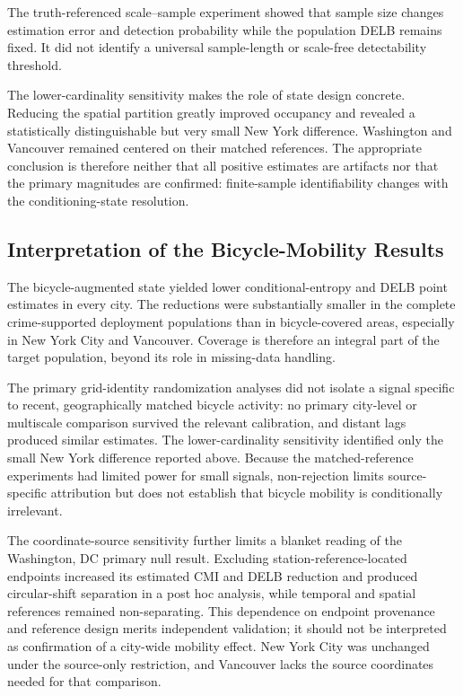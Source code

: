 \documentclass[applsci,article,accept,moreauthors]{Definitions/mdpi}
\begin{document}
{The truth-referenced scale--sample experiment showed that sample size
changes estimation error and detection probability while the population DELB
remains fixed. It did not identify a universal sample-length or scale-free
detectability threshold.}

{The lower-cardinality sensitivity makes the role of state design
concrete. Reducing the spatial partition greatly improved occupancy and
revealed a statistically distinguishable but very small New York difference.
Washington and Vancouver remained centered on their matched references. The
appropriate conclusion is therefore neither that all positive estimates are
artifacts nor that the primary magnitudes are confirmed: finite-sample
identifiability changes with the conditioning-state resolution.}

\subsection{Interpretation of the Bicycle-Mobility Results}
\label{subsec:discussion_rq3}

The bicycle-augmented state yielded lower conditional-entropy and DELB point
estimates in every city. The reductions were substantially smaller in the
complete crime-supported deployment populations than in bicycle-covered
areas, especially in New York City and Vancouver. Coverage is therefore an
integral part of the target population, beyond its role in missing-data
handling.

{The primary grid-identity randomization analyses did not isolate a signal
specific to recent, geographically matched bicycle activity: no primary
city-level or multiscale comparison survived the relevant calibration, and
distant lags produced similar estimates. The lower-cardinality sensitivity
identified only the small New York difference reported above. Because the matched-reference experiments had
limited power for small signals, non-rejection limits source-specific
attribution but does not establish that bicycle mobility is conditionally
irrelevant.}

{The coordinate-source sensitivity further limits a blanket reading of
the Washington, DC primary null result. Excluding station-reference-located
endpoints increased its estimated CMI and DELB reduction and produced
circular-shift separation in a post hoc analysis, while temporal and spatial
references remained non-separating. This dependence on endpoint provenance
and reference design merits independent validation; it should not be
interpreted as confirmation of a city-wide mobility effect. New York City
was unchanged under the source-only restriction, and Vancouver lacks the
source coordinates needed for that comparison.}
\end{document}
